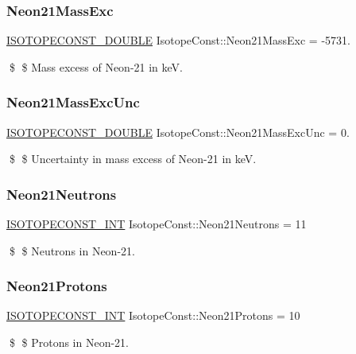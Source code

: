 \subsubsection{\texorpdfstring{Neon21\+Mass\+Exc}{Neon21MassExc}}
{\footnotesize\ttfamily \mbox{\hyperlink{group___isotope_const-_macros_ga8f45a7272ce02c0b4c65c44636ed719a}{I\+S\+O\+T\+O\+P\+E\+C\+O\+N\+S\+T\+\_\+\+D\+O\+U\+B\+LE}} Isotope\+Const\+::\+Neon21\+Mass\+Exc = -\/5731.}

\$ \$ Mass excess of Neon-\/21 in keV. \mbox{\label{group___isotope_const-_neon-_ne21_ga55832426d5479ef136377abf9dcdfa2d}} 
\subsubsection{\texorpdfstring{Neon21\+Mass\+Exc\+Unc}{Neon21MassExcUnc}}
{\footnotesize\ttfamily \mbox{\hyperlink{group___isotope_const-_macros_ga8f45a7272ce02c0b4c65c44636ed719a}{I\+S\+O\+T\+O\+P\+E\+C\+O\+N\+S\+T\+\_\+\+D\+O\+U\+B\+LE}} Isotope\+Const\+::\+Neon21\+Mass\+Exc\+Unc = 0.}

\$ \$ Uncertainty in mass excess of Neon-\/21 in keV. \mbox{\label{group___isotope_const-_neon-_ne21_gaab2a4623ba557c8ef7cc84a43a484f26}} 
\subsubsection{\texorpdfstring{Neon21\+Neutrons}{Neon21Neutrons}}
{\footnotesize\ttfamily \mbox{\hyperlink{group___isotope_const-_macros_ga5f18360b3e99483a35c32d789e62621c}{I\+S\+O\+T\+O\+P\+E\+C\+O\+N\+S\+T\+\_\+\+I\+NT}} Isotope\+Const\+::\+Neon21\+Neutrons = 11}

\$ \$ Neutrons in Neon-\/21. \mbox{\label{group___isotope_const-_neon-_ne21_ga112a111084ec18d0de281a2fda454608}} 
\subsubsection{\texorpdfstring{Neon21\+Protons}{Neon21Protons}}
{\footnotesize\ttfamily \mbox{\hyperlink{group___isotope_const-_macros_ga5f18360b3e99483a35c32d789e62621c}{I\+S\+O\+T\+O\+P\+E\+C\+O\+N\+S\+T\+\_\+\+I\+NT}} Isotope\+Const\+::\+Neon21\+Protons = 10}

\$ \$ Protons in Neon-\/21. 